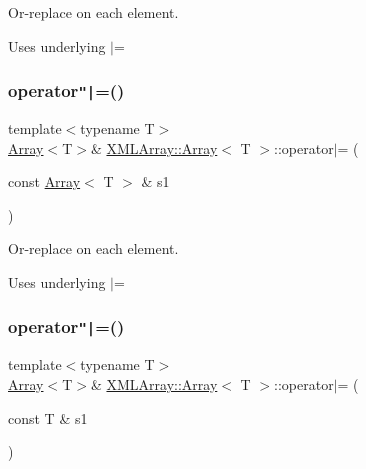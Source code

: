 Or-\/replace on each element. 

Uses underlying $\vert$= \mbox{\label{classXMLArray_1_1Array_a4a61c5f3146f39c99758bad927e08de7}} 
\subsubsection{\texorpdfstring{operator\texttt{"|}=()}{operator|=()}\hspace{0.1cm}{\footnotesize\ttfamily [2/4]}}
{\footnotesize\ttfamily template$<$typename T$>$ \\
\mbox{\hyperlink{classXMLArray_1_1Array}{Array}}$<$T$>$\& \mbox{\hyperlink{classXMLArray_1_1Array}{X\+M\+L\+Array\+::\+Array}}$<$ T $>$\+::operator$\vert$= (\begin{DoxyParamCaption}\item[{const \mbox{\hyperlink{classXMLArray_1_1Array}{Array}}$<$ T $>$ \&}]{s1 }\end{DoxyParamCaption})\hspace{0.3cm}{\ttfamily [inline]}}



Or-\/replace on each element. 

Uses underlying $\vert$= \mbox{\label{classXMLArray_1_1Array_a719213ff71df03fd3e561d1d4f9656cc}} 
\subsubsection{\texorpdfstring{operator\texttt{"|}=()}{operator|=()}\hspace{0.1cm}{\footnotesize\ttfamily [3/4]}}
{\footnotesize\ttfamily template$<$typename T$>$ \\
\mbox{\hyperlink{classXMLArray_1_1Array}{Array}}$<$T$>$\& \mbox{\hyperlink{classXMLArray_1_1Array}{X\+M\+L\+Array\+::\+Array}}$<$ T $>$\+::operator$\vert$= (\begin{DoxyParamCaption}\item[{const T \&}]{s1 }\end{DoxyParamCaption})\hspace{0.3cm}{\ttfamily [inline]}}



